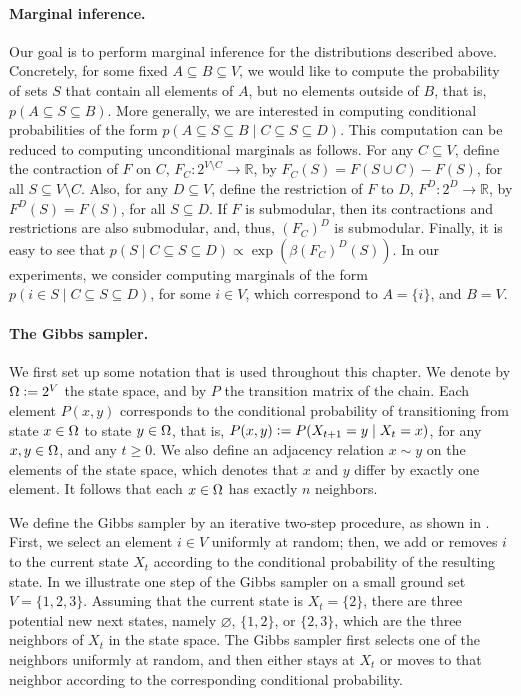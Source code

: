\paragraph{Marginal inference.}
Our goal is to perform marginal inference for the distributions described above.
Concretely, for some fixed $A \subseteq B \subseteq V$, we would like to compute the probability of sets $S$ that contain all elements of $A$, but no elements outside of $B$, that is, $p(A \subseteq S \subseteq B)$.
More generally, we are interested in computing conditional probabilities of the form $p(A \subseteq S \subseteq B \mid C \subseteq S \subseteq D)$.
This computation can be reduced to computing unconditional marginals as follows.
For any $C \subseteq V$, define the contraction of $F$ on $C$, $F_C : 2^{V \setminus C} \to \mathbb{R}$, by $F_C(S) = F(S \cup C) - F(S)$, for all $S \subseteq V \setminus C$.
Also, for any $D \subseteq V$, define the restriction of $F$ to $D$, $F^D : 2^D \to \mathbb{R}$, by $F^D(S) = F(S)$, for all $S \subseteq D$.
If $F$ is submodular, then its contractions and restrictions are also submodular, and, thus, $(F_C)^D$ is submodular.
Finally, it is easy to see that $p(S \mid C \subseteq S \subseteq D) \propto \exp(\beta (F_C)^D(S))$.
In our experiments, we consider computing marginals of the form $p(i \in S \mid C \subseteq S \subseteq D)$, for some $i \in V$, which correspond to $A = \{i\}$, and $B = V$.

\paragraph{The Gibbs sampler.}
We first set up some notation that is used throughout this chapter.
We denote by $\ss \defeq 2^V$ the state space, and by $P$ the transition matrix of the chain.
Each element $P(x, y)$ corresponds to the conditional probability of transitioning from state $x \in \ss$ to state $y \in \ss$, that is, $P(x, y) \defeq P(X_{t+1} = y \mid X_{t} = x)$, for any $x, y \in \ss$, and any $t \geq 0$.
We also define an adjacency relation $x \sim y$ on the elements of the state space, which denotes that $x$ and $y$ differ by exactly one element.
It follows that each $x \in \ss$ has exactly $n$ neighbors.

We define the Gibbs sampler by an iterative two-step procedure, as shown in .
First, we select an element $i \in V$ uniformly at random; then, we add or removes $i$ to the current state $X_t$ according to the conditional probability of the resulting state.
In  we illustrate one step of the Gibbs sampler on a small ground set $V = \{1, 2, 3\}$.
Assuming that the current state is $X_t = \{2\}$, there are three potential new next states, namely $\varnothing$, $\{1, 2\}$, or $\{2, 3\}$, which are the three neighbors of $X_t$ in the state space.
The Gibbs sampler first selects one of the neighbors uniformly at random, and then either stays at $X_t$ or moves to that neighbor according to the corresponding conditional probability.

